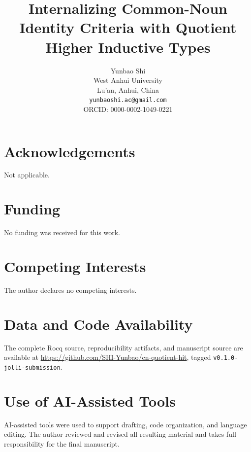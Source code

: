 \documentclass[11pt]{article}
\title{Internalizing Common-Noun Identity Criteria with Quotient Higher Inductive Types}
\author{Yunbao Shi\\
West Anhui University\\
Lu'an, Anhui, China\\
\texttt{yunbaoshi.ac@gmail.com}\\
ORCID: 0000-0002-1049-0221}
\date{}
\begin{document}
\maketitle

\section*{Acknowledgements}
Not applicable.

\section*{Funding}
No funding was received for this work.

\section*{Competing Interests}
The author declares no competing interests.

\section*{Data and Code Availability}
The complete Rocq source, reproducibility artifacts, and manuscript source are
available at \url{https://github.com/SHI-Yunbao/cn-quotient-hit}, tagged
\texttt{v0.1.0-jolli-submission}.

\section*{Use of AI-Assisted Tools}
AI-assisted tools were used to support drafting, code organization, and language
editing.  The author reviewed and revised all resulting material and takes full
responsibility for the final manuscript.
\end{document}
